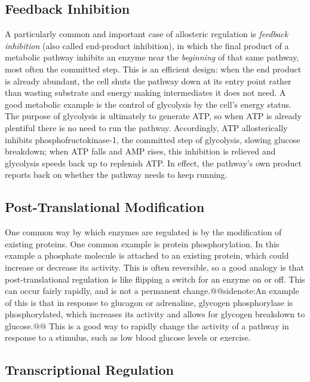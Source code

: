 \documentclass{tufte-handout}
\makeatletter
\def\sidenote#1{@@sidenote:#1@@}
\makeatother
\begin{document}
\subsection{Feedback Inhibition}
A particularly common and important case of allosteric regulation is \emph{feedback inhibition} (also called end-product inhibition), in which the final product of a metabolic pathway inhibits an enzyme near the \emph{beginning} of that same pathway, most often the committed step.  This is an efficient design: when the end product is already abundant, the cell shuts the pathway down at its entry point rather than wasting substrate and energy making intermediates it does not need.  A good metabolic example is the control of glycolysis by the cell's energy status.  The purpose of glycolysis is ultimately to generate ATP, so when ATP is already plentiful there is no need to run the pathway.  Accordingly, ATP allosterically inhibits phosphofructokinase-1, the committed step of glycolysis, slowing glucose breakdown; when ATP falls and AMP rises, this inhibition is relieved and glycolysis speeds back up to replenish ATP.  In effect, the pathway's own product reports back on whether the pathway needs to keep running.

\subsection{Post-Translational Modification}

One common way by which enzymes are regulated is by the modification of existing proteins.  One common example is protein phosphorylation.  In this example a phosphate molecule is attached to an existing protein, which could increase or decrease its activity.  This is often reversible, so a good analogy is that post-translational regulation is like flipping a switch for an enzyme on or off.  This can occur fairly rapidly, and is not a permanent change.\sidenote{An example of this is that in response to glucagon or adrenaline, glycogen phosphorylase\index{Enzymes!Glycogen Phosphorylase} is phosphorylated, which increases its activity and allows for glycogen breakdown to glucose.}  This is a good way to rapidly change the activity of a pathway in response to a stimulus, such as low blood glucose levels or exercise.

\subsection{Transcriptional Regulation}
\end{document}
